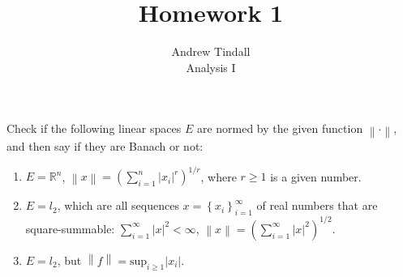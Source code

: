 \documentclass[12pt]{article}
\newcommand{\R}{\mathbb{R}}
\theoremstyle{definition}
\newenvironment{problem}[2][Problem]{\begin{trivlist}
\item[\hskip \labelsep {\bfseries #1}\hskip \labelsep {\bfseries #2.}]}{\end{trivlist}}
\begin{document}
 
 
\title{Homework 1}
\author{Andrew Tindall\\
	Analysis I}
 
\maketitle
\begin{problem}{1}
	Check if the following linear spaces $E$ are normed by the given function $\left \lVert { \cdot } \right \lVert $, and then say if they are Banach or not:	
	\begin{enumerate}[label=(\roman*)]
		\item $E = \R^n$, $\left \lVert { x } \right \lVert  = (\sum_{i=1}^n \lvert x_i \rvert^r)^{1/r}$, where $r \geq 1$ is a given number.
		\item $E = l_2$, which are all sequences $x = \left\{ x_i \right\}_{i=1}^\infty$ of real numbers that are square-summable: $\sum_{i=1}^\infty \lvert x \rvert^2 < \infty$, $\left \lVert { x } \right \lVert  = \left( \sum_{i=1}^\infty \lvert x \rvert^2 \right)^{1/2}$.
		\item $E = l_2$, but $\left \lVert { f } \right \lVert  = \text{sup}_{i\geq 1} \left \lvert { x_i } \right \lvert $.
	\end{enumerate}
\end{problem}
\end{document}
